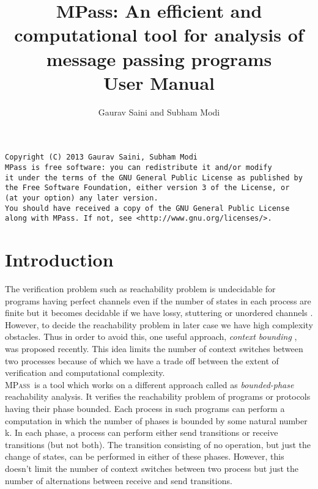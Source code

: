 \documentclass[a4paper]{article}
\title{MPass: \large{An efficient and computational tool for analysis of message passing programs}\\\small{User Manual}}
\author{Gaurav Saini and Subham Modi}
\newcommand{\MPass}{\textsc{MPass}}
\begin{document}
\maketitle

\pagebreak

\begin{Verbatim}[fontsize=\small]
Copyright (C) 2013 Gaurav Saini, Subham Modi
MPass is free software: you can redistribute it and/or modify
it under the terms of the GNU General Public License as published by
the Free Software Foundation, either version 3 of the License, or
(at your option) any later version.
You should have received a copy of the GNU General Public License
along with MPass. If not, see <http://www.gnu.org/licenses/>.
\end{Verbatim}

\pagebreak

\tableofcontents

\pagebreak

\section{Introduction}

The verification problem such as reachability problem is undecidable for programs having perfect channels 
even if the number of states in each process are finite but it becomes decidable if we have 
lossy, stuttering or unordered channels \cite{AB93}.
However, to decide the reachability problem in later case we have high complexity obstacles.
Thus in order to avoid this, one useful approach, \emph{context bounding} \cite{SJ05}, was proposed recently.
This idea limits the number of context switches between two processes because of which 
we have a trade off between the extent of verification and computational complexity.\\


\MPass\ is a tool which works on a different approach called as \emph{bounded-phase} 
reachability analysis. It verifies the reachability problem of programs or protocols
having their phase bounded. Each process in such programs can perform a computation in which 
the number of phases is bounded by some natural number k. In each phase, a process can perform 
either send transitions or receive transitions (but not both). The transition consisting of no operation, 
but just the change of states, can be performed in either of these phases. However, this doesn't limit the 
number of context switches between two process but just the number of alternations between receive and 
send transitions.\\
\end{document}
